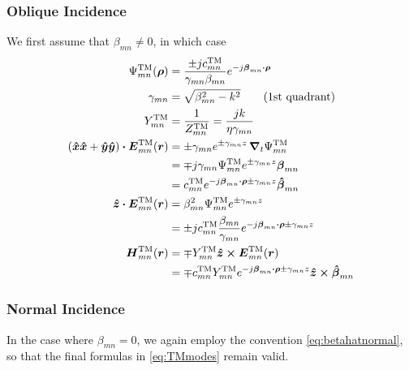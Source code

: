 \subsubsection{Oblique Incidence}
We first assume that $\beta_{mn} \neq 0$, in which case 
\begin{subequations}
  \label{eq:TMmodes}
  \begin{align}
    \Psi_{mn}^{\text{TM}}(\boldsymbol{\rho}) &= \frac{\pm j c_{mn}^{\text{TM}}}{\gamma_{mn}\beta_{mn}}
    e^{-j\boldsymbol{\beta}_{mn} \boldsymbol{\cdot} \boldsymbol{\rho}} \\
    \gamma_{mn} &= \sqrt{\beta_{mn}^2 - k^2} \qquad \text{(1st quadrant)} \\
    Y_{mn}^{\text{TM}} &= \frac{1}{Z_{mn}^{\text{TM}}} = \frac{jk}{\eta\gamma_{mn}} \\
    (\boldsymbol{\hat{x}}\boldsymbol{\hat{x}}+\boldsymbol{\hat{y}}\boldsymbol{\hat{y}}) \boldsymbol{\cdot} \boldsymbol{E}_{mn}^{\text{TM}}(\boldsymbol{r}) &= \pm \gamma_{mn} e^{\pm\gamma_{mn}z}
    \,\boldsymbol{\nabla}_t \Psi_{mn}^{\text{TM}} \nonumber \\
    &= 
    \mp j \gamma_{mn} \Psi_{mn}^{\text{TM}} e^{\pm\gamma_{mn}z}  \boldsymbol{\beta}_{mn}
    \nonumber \\
    &= c_{mn}^{\text{TM}} e^{-j\boldsymbol{\beta}_{mn}\boldsymbol{\cdot}\boldsymbol{\rho} \pm \gamma_{mn} z}
    \boldsymbol{\hat{\beta}}_{mn} \\
    \boldsymbol{\hat{z}} \boldsymbol{\cdot} \boldsymbol{E}_{mn}^{\text{TM}}(\boldsymbol{r}) &= 
    \beta_{mn}^2 \Psi_{mn}^{\text{TM}} e^{\pm\gamma_{mn} z} \nonumber \\
    &= \pm j c_{mn}^{\text{TM}} \frac{\beta_{mn}}{\gamma_{mn}} 
    e^{-j\boldsymbol{\beta}_{mn}\boldsymbol{\cdot}\boldsymbol{\rho} \pm \gamma_{mn} z} \\
    \boldsymbol{H}_{mn}^{\text{TM}}(\boldsymbol{r}) &= \mp Y_{mn}^{\text{TM}} \boldsymbol{\hat{z}} \boldsymbol{\times} \boldsymbol{E}_{mn}^{\text{TM}}(\boldsymbol{r}) \nonumber \\
     &= \mp c_{mn}^{\text{TM}} Y_{mn}^{\text{TM}}
     e^{-j\boldsymbol{\beta}_{mn}\boldsymbol{\cdot}\boldsymbol{\rho} \pm \gamma_{mn} z}
     \boldsymbol{\hat{z}}\boldsymbol{\times}\boldsymbol{\hat{\beta}}_{mn} 
  \end{align}
\end{subequations}

\subsubsection{Normal Incidence}
In the case where $\beta_{mn} = 0$, we again employ the convention
\eqref{eq:betahatnormal}, so that the final formulas in
\eqref{eq:TMmodes}
remain valid.

